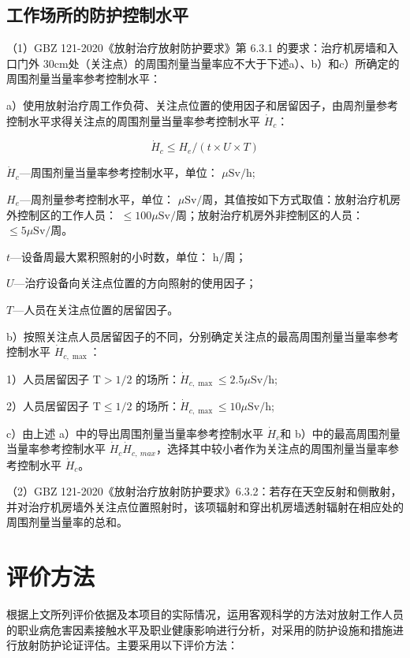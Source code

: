 \subsection{工作场所的防护控制水平}


（1）GBZ 121-2020《放射治疗放射防护要求》第 6.3.1 的要求：治疗机房墙和入口门外 $3 0 \mathrm { c m }$处（关注点）的周围剂量当量率应不大于下述a）、b）和c）所确定的周围剂量当量率参考控制水平：

a）使用放射治疗周工作负荷、关注点位置的使用因子和居留因子，由周剂量参考控制水平求得关注点的周围剂量当量率参考控制水平 $\dot { H } _ { c }$：

\begin{equation}
    \dot{H}_c\leq H_e /(t\times U\times T)
\end{equation}


$\dot { H } _ { c }$—周围剂量当量率参考控制水平，单位： $\mu \mathrm { S v / h }$;

$H _ { e }$—周剂量参考控制水平，单位： $\mu \mathrm { S v } / $周，其值按如下方式取值：放射治疗机房外控制区的工作人员： $\leq 1 0 0 \mu \mathrm { S v } /\text{周}$；放射治疗机房外非控制区的人员： ${ \le } 5 \mu \mathrm { S } \mathrm { v }/\text{周}$。

$t$—设备周最大累积照射的小时数，单位： $\mathrm { h }/\text{周}$；

$U$—治疗设备向关注点位置的方向照射的使用因子；

$T$—人员在关注点位置的居留因子。

b）按照关注点人员居留因子的不同，分别确定关注点的最高周围剂量当量率参考控制水平 $\dot{H}_{c,\max}$：

1）人员居留因子 $\mathrm{T}>1/2$ 的场所：$\dot{H}_{c,\max}\le2.5\mu\mathrm{Sv/h}$;

2）人员居留因子 $\mathrm{T}\le1/2$ 的场所：$\dot{H}_{c,\max}\le10\mu\mathrm{Sv/h}$;

c）由上述 a）中的导出周围剂量当量率参考控制水平 $\dot { H } _ { c }$和 b）中的最高周围剂量当量率参考控制水平 $\dot { H } _ { c }$$\dot { H } _ { c , \ m a x }$，选择其中较小者作为关注点的周围剂量当量率参考控制水平 $\dot { H } _ { c }$。

（2）GBZ 121-2020《放射治疗放射防护要求》6.3.2：若存在天空反射和侧散射，并对治疗机房墙外关注点位置照射时，该项辐射和穿出机房墙透射辐射在相应处的周围剂量当量率的总和。


\section{评价方法}
根据上文所列评价依据及本项目的实际情况，运用客观科学的方法对放射工作人员的职业病危害因素接触水平及职业健康影响进行分析，对采用的防护设施和措施进行放射防护论证评估。主要采用以下评价方法：


